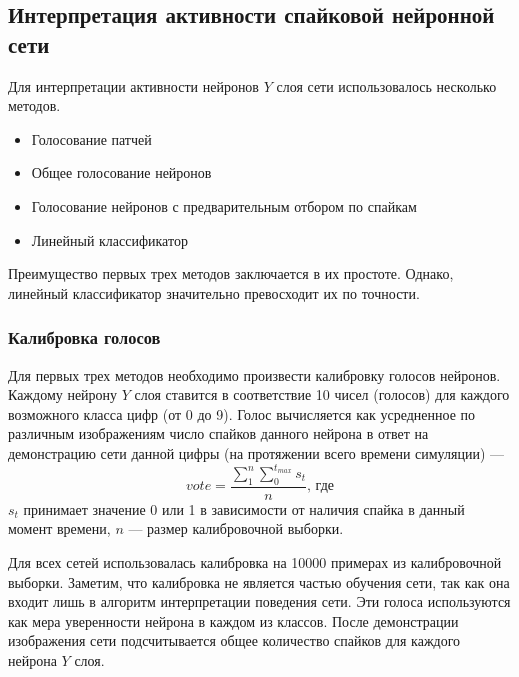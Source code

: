 \documentclass[a4paper]{article}
\begin{document}
\subsection{Интерпретация активности спайковой нейронной сети}

Для интерпретации активности нейронов $Y$ слоя сети использовалось несколько методов.

\begin{itemize}
 \item Голосование патчей
 \item Общее голосование нейронов
 \item Голосование нейронов с предварительным отбором по спайкам
 \item Линейный классификатор
\end{itemize}

Преимущество первых трех методов заключается в их простоте. Однако, линейный классификатор значительно превосходит их по точности.\\

\subsubsection{Калибровка голосов} \label{calibration}
Для первых трех методов необходимо произвести калибровку голосов нейронов. Каждому нейрону $Y$ слоя ставится в соответствие 10 чисел (голосов) для каждого возможного класса цифр (от 0 до 9). Голос вычисляется как усредненное по различным изображениям число спайков данного нейрона в ответ на демонстрацию сети данной цифры (на протяжении всего времени симуляции) ---
$$vote = \frac{\sum_{1}^{n} {\sum_{0}^{t_{max}} s_t}}{n} \text{, где}$$
$s_t$ принимает значение 0 или 1 в зависимости от наличия спайка в данный момент времени, $n$ --- размер калибровочной выборки.

Для всех сетей использовалась калибровка на 10000 примерах из калибровочной выборки. Заметим, что калибровка не является частью обучения сети, так как она входит лишь в алгоритм интерпретации поведения сети. Эти голоса используются как мера уверенности нейрона в каждом из классов. После демонстрации изображения сети подсчитывается общее количество спайков для каждого нейрона $Y$ слоя.
\end{document}
